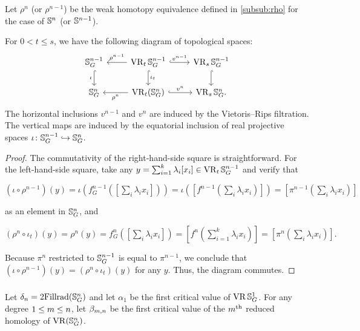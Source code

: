 Let $\rho^n$ (or $\rho^{n-1}$) be the weak homotopy equivalence defined in \cref{subsub:rho} for the case of $\mathbb{S}^n$ (or $\mathbb{S}^{n-1}$).

\medskip\lemma
For $0<t\leq s $, we have the following diagram of topological spaces:
\begin{equation}\label{d:fundamental_bars_diagram}
	\begin{tikzcd}
		\bS^{n-1}_G
		\ar[d, hook,"{\iota}" left]
		&
		\VR_t\bS^{n-1}_G
		\ar[d, hook,"\iota_t"]
		\ar[l, "\rho^{n-1}" above]
		\ar[r, hook, "v^{n-1}"]
		&
		\VR_{s}\bS^{n-1}_G
		\ar[d, hook]
		\\
		\bS^{n}_G
		&
		\VR_t(\bS^{n}_G)
		\ar[l, "\rho^n" below]
		\ar[r, hook, "v^{n}"]
		&
		\VR_{s}\bS^{n}_G.
	\end{tikzcd}
\end{equation}
The horizontal inclusions $v^{n-1}$ and $v^n$ are induced by the Vietoris--Rips filtration.
The vertical maps are induced by the equatorial inclusion of real projective spaces $\iota \colon \mathbb{S}^{n-1}_G \hookrightarrow \mathbb{S}^{n}_G$.

\begin{proof}
	The commutativity of the right-hand-side square is straightforward.
	For the left-hand-side square, take any $y = \sum_{i=1}^k \lambda_i [x_i] \in \operatorname{VR}_t\mathbb{S}^{n-1}_G$ and verify that
	\begin{center}
		$(\iota \circ \rho^{n-1})(y)
		=\iota(f^{n-1}_G([\sum_i \lambda_i x_i]))
		=\iota([f^{n-1}(\sum_i \lambda_i x_i)])
		=[\pi^{n-1}(\sum_i \lambda_i x_i)]
		$
	\end{center}
	as an element in $\mathbb{S}^n_G$, and
	\begin{center}
		$(\rho^{n} \circ \iota_t)(y) = \rho^{n}(y) = f^{n}_G([\sum_i \lambda_i x_i]) = [f^{n}(\sum_{i=1}^k \lambda_i x_i)] = [\pi^{n}(\sum_i \lambda_i x_i)].
		$
	\end{center}
	Because $\pi^{n}$ restricted to $\mathbb{S}^{n-1}_G$ is equal to $\pi^{n-1}$, we conclude that $(\iota \circ \rho^{n-1})(y) = (\rho^n \circ \iota_t)(y)$ for any $y$.
	Thus, the diagram commutes.
\end{proof}

\subsubsection{}
\label{subsub:foundamental_bar_rpn_lemma}

Let $\delta_n=2\mathrm{Fillrad}(\mathbb{S}^n_G)$ and
let $\alpha_1$ be the first critical value of $\operatorname{VR}\mathbb{S}^1_G$.
For any degree $1 \leq m \leq n$, let $\beta_{m, n}$ be the first critical value of the $m^{\mathrm{th}}$ reduced homology of $\operatorname{VR}(\mathbb{S}^n_G)$.

